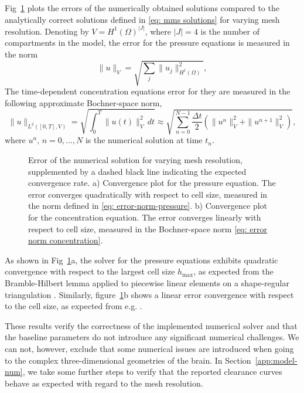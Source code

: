 \documentclass[a4paper,11pt]{article}
\newcommand{\1}{^{(1)}}
\newcommand{\2}{^{(2)}}
\begin{document}
Fig~\ref{fig: mms convergence} plots the errors of the numerically obtained solutions compared to the analytically correct solutions defined in \eqref{eq: mms solutions} for varying mesh resolution. Denoting by $V = H^1(\Omega)^{\lvert J \rvert}$, where $|J|=4$ is the number of compartments in the model, the error for the pressure equations is measured in the norm
\begin{equation}
    \|u\|_V = \sqrt{\sum_{j}\|u_j\|^2_{H^1(\Omega)}},
    \label{eq: error-norm-pressure}
\end{equation}
The time-dependent concentration equations error for they are measured in the following approximate Bochner-space norm,
\begin{equation}
    \|u\|_{L^2([0, T], V)} = \sqrt{\int_0^T \|u(t)\|_{V}^2 \,dt } \approx \sqrt{\sum_{n=0}^{N-1} \frac{\Delta t}{2}\left(\|u^{n}\|_{V}^2 + \|u^{n+1}\|_{V}^2\right)},
\label{eq: error norm concentration}
\end{equation}
where $u^n,\, n=0, ..., N$ is the numerical solution at time $t_n$.
\begin{figure}[hbt]
    \centering
    \caption{Error of the numerical solution for varying mesh resolution, supplemented by a dashed black line indicating the expected convergence rate. a) Convergence plot for the pressure equation. The error converges quadratically with respect to cell size, measured in the norm defined in \eqref{eq: error-norm-pressure}. b) Convergence plot for the concentration equation. The error converges linearly with respect to cell size, measured in the Bochner-space norm \eqref{eq: error norm concentration}.}
    \label{fig: mms convergence}
\end{figure}

As shown in Fig~\ref{fig: mms convergence}a, the solver for the pressure equations exhibits quadratic convergence with respect to the largest cell size $h_{\text{max}}$, as expected from the Bramble-Hilbert lemma applied to piecewise linear elements on a shape-regular triangulation \cite[p. 79 Theorem 6.4]{braess2001finitelements}. Similarly, figure~\ref{fig: mms convergence}b shows a linear error convergence with respect to the cell size, as expected from e.g. \cite[Theorem 5.1 p. 134]{Quarteroni2009numerical}. 

These results verify the correctness of the implemented numerical solver and that the baseline parameters do not introduce any significant numerical challenges. We can not, however, exclude that some numerical issues are introduced when going to the complex three-dimensional geometries of the brain. In Section~\ref{app:model-num}, we take some further steps to verify that the reported clearance curves behave as expected with regard to the mesh resolution.
\end{document}
